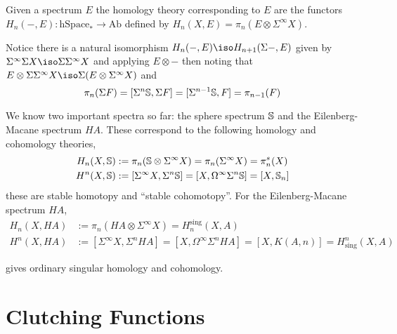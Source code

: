 \documentclass[12pt]{extarticle}
\begin{document}
\begin{defn}
Given a spectrum $E$ the homology theory corresponding to $E$ are the functors $H_n(-,E) : \mathrm{hSpace}_* \to \mathrm{Ab}$ defined by $H_n(X,E) = \pi_n(E \otimes \Sigma^\infty X)$.
\end{defn}

\begin{rmk}
Notice there is a natural isomorphism $H_n(-,E) \iso H_{n+1}(\Sigma -, E)$ given by $\Sigma^\infty \Sigma X \iso \Sigma \Sigma^\infty X$ and applying $E \otimes -$ then noting that $E \otimes \Sigma \Sigma^\infty X \iso \Sigma (E \otimes \Sigma^\infty X)$ and
\[ \pi_n(\Sigma F) = [\Sigma^n \S, \Sigma F] = [\Sigma^{n-1} \S, F] = \pi_{n-1}(F) \]
\end{rmk}

\begin{rmk}
We know two important spectra so far: the sphere spectrum $\S$ and the Eilenberg-Macane spectrum $HA$. These correspond to the following homology and cohomology theories,
\begin{align*}
H_n(X, \S) & := \pi_n(\S \otimes \Sigma^\infty X) = \pi_n(\Sigma^\infty X) = \pi_n^s(X)
\\
H^n(X, \S) & := [\Sigma^\infty X, \Sigma^n \S] = [X, \Omega^\infty \Sigma^n \S] = [X, \S_n] 
\end{align*}
these are stable homotopy and ``stable cohomotopy''. For the Eilenberg-Macane spectrum $HA$,
\begin{align*}
H_n(X, HA) & := \pi_n(HA \otimes \Sigma^\infty X) = H_n^{\text{sing}}(X, A)
\\
H^n(X, HA) & := [\Sigma^\infty X, \Sigma^n HA] = [X, \Omega^\infty \Sigma^n HA] = [X, K(A,n)] = H^n_{\text{sing}}(X, A)
\end{align*}
\end{rmk}
gives ordinary singular homology and cohomology.

\section{Clutching Functions}
\end{document}
